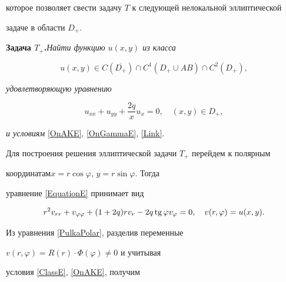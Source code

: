 которое позволяет свести задачу $T$ к следующей нелокальной эллиптической 


задаче в области $D_+$.


\medskip





{\bf Задача $T_+$.}{\it Найти функцию $u(x,y)$ из класса}


\begin{equation}\label{ClassE}


u(x,y)\in C(\overline{D_+}) \cap


C^1(D_+\cup AB) \cap C^2(D_+),


\end{equation}


{\it удовлетворяющую уравнению}


\begin{equation}\label{EquationE}


u_{xx}+u_{yy} + \frac{2q}{x} u_x =0,\quad(x,y) \in D_+,


\end{equation}


{\it и условиям} \eqref{OnAKE}, \eqref{OnGammaE}, \eqref{Link}.


\medskip





Для построения решения эллиптической задачи $T_+$ перейдем к полярным 


координатам\linebreak $x=r\cos\varphi$, $ y=r\sin\varphi$. Тогда 


уравнение \eqref{EquationE} принимает вид


\begin{equation}\label{PulkaPolar}


r^2 v_{rr}+v_{\varphi\varphi} +(1+2q)r v_r -2q\tg\varphi v_\varphi =0,


\quad v(r,\varphi) = u(x,y).


\end{equation}


Из уравнения \eqref{PulkaPolar}, разделив переменные


$v(r,\varphi)=R(r)\cdot\Phi(\varphi)\ne0$ и учитывая


условия \eqref{ClassE}, \eqref{OnAKE}, получим


